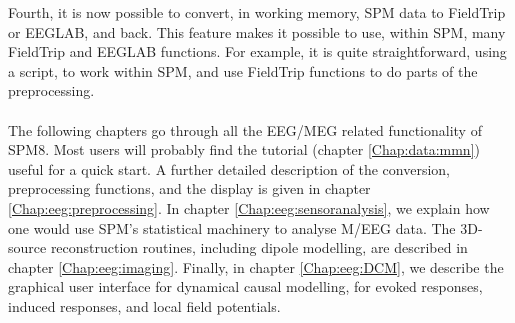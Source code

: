 Fourth, it is now possible to convert, in working memory, SPM data to FieldTrip or EEGLAB, and back. This feature makes it possible to use, within SPM, many FieldTrip and EEGLAB functions. For example, it is quite straightforward, using a script, to work within SPM, and use FieldTrip functions to do parts of the preprocessing.
\\
\\
The following chapters go through all the EEG/MEG related functionality of SPM8. Most users will probably find the tutorial (chapter \ref{Chap:data:mmn}) useful for a quick start. A further detailed description of the conversion, preprocessing functions, and the display is given in chapter \ref{Chap:eeg:preprocessing}. In chapter \ref{Chap:eeg:sensoranalysis}, we explain how one would use SPM's statistical machinery to analyse M/EEG data. The 3D-source reconstruction routines, including dipole modelling, are described in chapter \ref{Chap:eeg:imaging}. Finally, in chapter \ref{Chap:eeg:DCM}, we describe the graphical user interface for dynamical causal modelling, for evoked responses, induced responses, and local field potentials.
